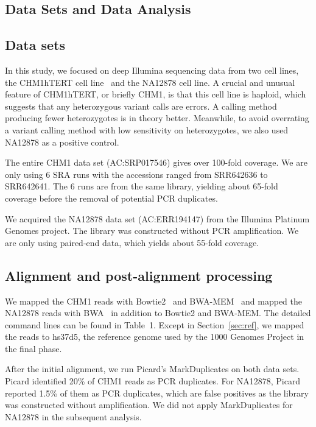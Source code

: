 \documentclass{bioinfo-ori}
\begin{document}
\begin{methods}
\section{Data Sets and Data Analysis}

\subsection{Data sets}

In this study, we focused on deep Illumina sequencing data from two cell lines,
the CHM1hTERT cell line~\citep{Jacobs:1980aa} and the NA12878 cell line. A
crucial and unusual feature of CHM1hTERT, or briefly CHM1, is that this cell
line is haploid, which suggests that any heterozygous variant calls are errors.
A calling method producing fewer heterozygotes is in theory better. Meanwhile,
to avoid overrating a variant calling method with low sensitivity on
heterozygotes, we also used NA12878 as a positive control.

The entire CHM1 data set (AC:SRP017546) gives over 100-fold coverage. We are
only using 6 SRA runs with the accessions ranged from SRR642636 to SRR642641.
The 6 runs are from the same library, yielding about 65-fold coverage before
the removal of potential PCR duplicates.

We acquired the NA12878 data set (AC:ERR194147) from the Illumina Platinum
Genomes project. The library was constructed without PCR amplification. We are
only using paired-end data, which yields about 55-fold coverage.

\subsection{Alignment and post-alignment processing}

We mapped the CHM1 reads with Bowtie2~\citep{Langmead:2012fk} and
BWA-MEM~\citep{Li:2013aa} and mapped the NA12878 reads with
BWA~\citep{Li:2009uq} in addition to Bowtie2 and BWA-MEM. The detailed command
lines can be found in Table~1. Except in Section~\ref{sec:ref}, we mapped the
reads to hs37d5, the reference genome used by the 1000 Genomes Project in the
final phase.

After the initial alignment, we run Picard's MarkDuplicates on both data sets.
Picard identified 20\% of CHM1 reads as PCR duplicates. For NA12878,
Picard reported 1.5\% of them as PCR duplicates, which are false positives as
the library was constructed without amplification. We did not apply
MarkDuplicates for NA12878 in the subsequent analysis.


\end{methods}
\end{document}
